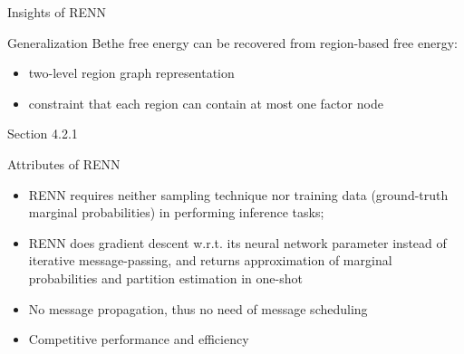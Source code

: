 \begin{frame}{Insights of RENN}
  \begin{block}{Generalization}
    Bethe free energy can be recovered from region-based free energy:
    \begin{itemize}[label=\textbullet]
    \item two-level region graph representation
    \item constraint that each region can contain at most one factor node
    \end{itemize}
    {\tiny Section 4.2.1}
  \end{block}
  \begin{block}{Attributes of RENN}
    \begin{itemize}[label=\textbullet]
    \item RENN requires neither sampling technique nor training data (ground-truth marginal probabilities) in performing inference tasks;
    \item RENN does gradient descent w.r.t. its neural network parameter instead of iterative message-passing, and returns approximation of marginal probabilities and partition estimation in one-shot
    \item No message propagation, thus no need of message scheduling
    \item Competitive performance and efficiency
    \end{itemize}
  \end{block}
\end{frame}

